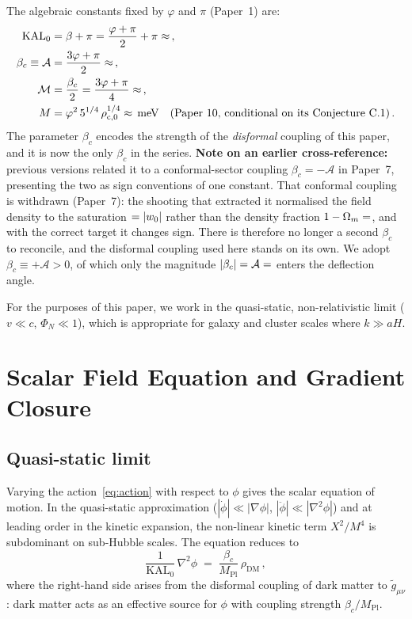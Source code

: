 \documentclass[12pt,a4paper]{article}
\newcommand{\phiG}{\varphi}
\newcommand{\KAL}{\mathrm{KAL}_0}
\newcommand{\MIRA}{\mathcal{M}}
\newcommand{\AURA}{\mathcal{A}}
\newcommand{\Mpl}{M_{\mathrm{Pl}}}
\newcommand{\Omm}{\Omega_{m}}
\newcommand{\bc}{\beta_c}
\newcommand{\rhoc}{\rho_{\mathrm{c},0}}
\begin{document}
The algebraic constants fixed by $\phiG$ and $\pi$ (Paper~1) are:
\begin{align}
  \KAL    &= \beta + \pi = \frac{\phiG+\pi}{2} + \pi \approx \val{KAL0_d3}\,,
              \label{eq:KAL}\\
  \bc \equiv \AURA &= \frac{3\phiG+\pi}{2} \approx \val{AURA_d3}\,,
              \label{eq:bc}\\
  \MIRA   &= \frac{\bc}{2} = \frac{3\phiG+\pi}{4} \approx \val{MIRA_d4}\,,
              \label{eq:MIRA}\\
  M       &= \phiG^2\,5^{1/4}\,\rhoc^{1/4} \approx \val{M_meV_d2}\,\mathrm{meV}
              \quad\text{(Paper~10, conditional on its Conjecture~C.1)}\,.
              \label{eq:M}
\end{align}
The parameter $\bc$ encodes the strength of the \emph{disformal} coupling of
this paper, and it is now the only $\bc$ in the series.
\textbf{Note on an earlier cross-reference:} previous versions related it to a
conformal-sector coupling $\bc = -\AURA$ in Paper~7, presenting the two as
sign conventions of one constant.  That conformal coupling is withdrawn
(Paper~7): the shooting that extracted it normalised the field density to the
saturation $\val{S_DE_d6} = |w_0|$ rather than the density fraction
$1-\Omm = \val{OMDE_DENS_d6}$, and with the correct target it changes sign.  There is
therefore no longer a second $\bc$ to reconcile, and the disformal coupling
used here stands on its own.  We adopt $\bc \equiv +\AURA > 0$, of which only
the magnitude $|\bc| = \AURA = \val{AURA_d6}$ enters the deflection angle.

For the purposes of this paper, we work in the quasi-static, non-relativistic
limit ($v \ll c$, $\Phi_N \ll 1$), which is appropriate for galaxy and
cluster scales where $k \gg aH$.

\section{Scalar Field Equation and Gradient Closure}
\label{sec:eom}

\subsection{Quasi-static limit}

Varying the action~\eqref{eq:action} with respect to $\phi$ gives the
scalar equation of motion.
In the quasi-static approximation
($|\dot\phi| \ll |\nabla\phi|$, $|\ddot\phi| \ll |\nabla^2\phi|$)
and at leading order in the kinetic expansion, the non-linear kinetic
term $X^2/M^4$ is subdominant on sub-Hubble scales.
The equation reduces to
\begin{equation}
  \frac{1}{\KAL}\,\nabla^2\phi \;=\; \frac{\bc}{\Mpl}\,\rho_{\mathrm{DM}}\,,
  \label{eq:phi_eom}
\end{equation}
where the right-hand side arises from the disformal coupling of dark matter
to $\tilde{g}_{\mu\nu}$: dark matter acts as an effective source for $\phi$
with coupling strength $\bc/\Mpl$.
\end{document}
